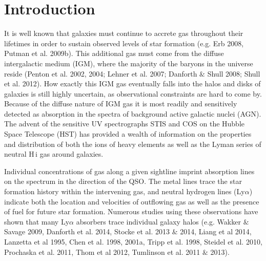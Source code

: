 \documentclass[iop]{emulateapj-rtx4}
\begin{document}
%


\section{Introduction}

It is well known that galaxies must continue to accrete gas throughout their lifetimes in order to sustain observed levels of star formation (e.g. Erb 2008, Putman et al. 2009b). This additional gas must come from the diffuse intergalactic medium (IGM), where the majority of the baryons in the universe reside (Penton et al. 2002, 2004; Lehner et al. 2007; Danforth $\&$ Shull 2008; Shull et al. 2012). How exactly this IGM gas eventually falls into the halos and disks of galaxies is still highly uncertain, as observational constraints are hard to come by. Because of the diffuse nature of IGM gas it is most readily and sensitively detected as absorption in the spectra of background active galactic nuclei (AGN). The advent of the sensitive UV spectrographs STIS and COS on the Hubble Space Telescope (HST) has provided a wealth of information on the properties and distribution of both the ions of heavy elements as well as the Lyman series of neutral H\,{\sc i} gas around galaxies. 

Individual concentrations of gas along a given sightline imprint absorption lines on the spectrum in the direction of the QSO. The metal lines trace the star formation history within the intervening gas, and neutral hydrogen lines (Ly$\alpha$) indicate both the location and velocities of outflowing gas as well as the presence of fuel for future star formation. Numerous studies using these observations have shown that many Ly$\alpha$ absorbers trace individual galaxy halos (e.g. Wakker $\&$ Savage 2009, Danforth et al. 2014, Stocke et al. 2013 $\&$ 2014, Liang et al 2014, Lanzetta et al 1995, Chen et al. 1998, 2001a, Tripp et al. 1998, Steidel et al. 2010, Prochaska et al. 2011, Thom et al 2012, Tumlinson et al. 2011 $\&$ 2013). 


\end{document}

